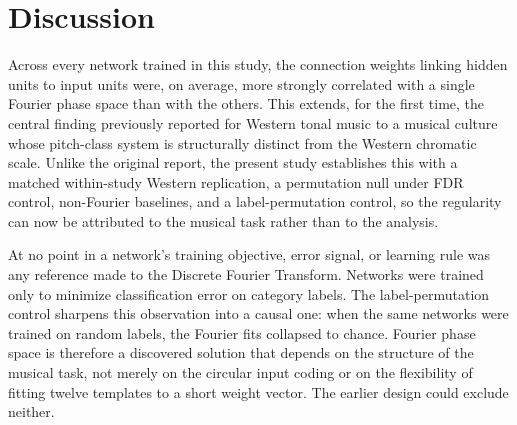 \documentclass[pdflatex,sn-nature]{sn-jnl}
\begin{document}
\section{Discussion}

Across every network trained in this study, the connection weights linking hidden units to
input units were, on average, more strongly correlated with a single Fourier phase space
than with the others. This extends, for the first time, the central finding previously
reported for Western tonal music \cite{dawson2020} to a musical culture whose pitch-class
system is structurally distinct from the Western chromatic scale. Unlike the original report,
the present study establishes this with a matched within-study Western replication, a
permutation null under FDR control, non-Fourier baselines, and a label-permutation control,
so the regularity can now be attributed to the musical task rather than to the analysis.

At no point in a network's training objective, error signal, or learning rule was any
reference made to the Discrete Fourier Transform. Networks were trained only to minimize
classification error on category labels. The label-permutation control sharpens this
observation into a causal one: when the same networks were trained on random labels, the
Fourier fits collapsed to chance. Fourier phase space is therefore a discovered solution
that depends on the structure of the musical task, not merely on the circular input coding
or on the flexibility of fitting twelve templates to a short weight vector. The earlier
design could exclude neither.
\end{document}
